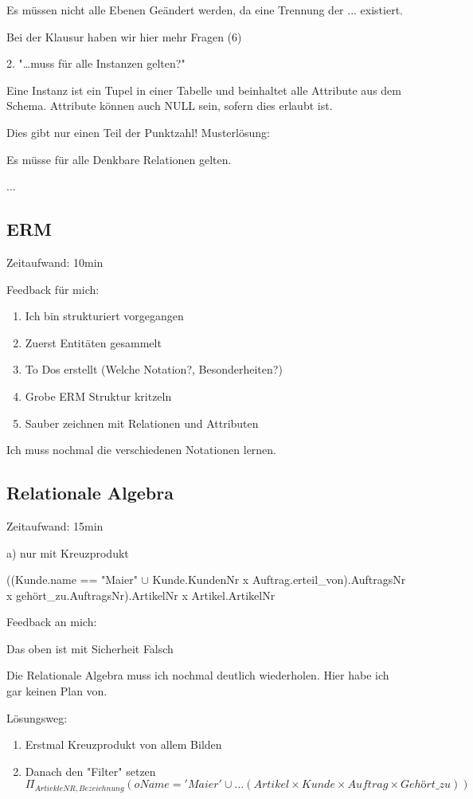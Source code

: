 \documentclass[a4paper]{article}
\begin{document}
Es müssen nicht alle Ebenen Geändert werden, da eine Trennung der ... existiert.

Bei der Klausur haben wir hier mehr Fragen (6)

2. "\dots muss für alle Instanzen gelten?"

Eine Instanz ist ein Tupel in einer Tabelle und beinhaltet alle Attribute aus dem Schema. Attribute können auch NULL sein, sofern dies erlaubt ist.

Dies gibt nur einen Teil der Punktzahl! Musterlösung:

Es müsse für alle Denkbare Relationen gelten.

...

\subsection{ERM}

Zeitaufwand: 10min

Feedback für mich:

\begin{enumerate}
    \item Ich bin strukturiert vorgegangen
    \item Zuerst Entitäten gesammelt
    \item To Dos erstellt (Welche Notation?, Besonderheiten?)
    \item Grobe ERM Struktur kritzeln
    \item Sauber zeichnen mit Relationen und Attributen
\end{enumerate}

Ich muss nochmal die verschiedenen Notationen lernen.

\subsection{Relationale Algebra}

Zeitaufwand: 15min

a) nur mit Kreuzprodukt

((Kunde.name == "Maier" $\cup$ Kunde.KundenNr x Auftrag.erteil\_von).AuftragsNr x gehört\_zu.AuftragsNr).ArtikelNr x Artikel.ArtikelNr

Feedback an mich:

Das oben ist mit Sicherheit Falsch

Die Relationale Algebra muss ich nochmal deutlich wiederholen. Hier habe ich gar keinen Plan von.

Lösungsweg:

\begin{enumerate}
    \item Erstmal Kreuzprodukt von allem Bilden
    \item Danach den "Filter" setzen
    \begin{equation*}
        \Pi_{ArtiekleNR, Bezeichnung} (o Name='Maier' \cup \dots (Artikel \times Kunde \times Auftrag \times Gehört\_zu))
    \end{equation*}
\end{enumerate}
\end{document}
